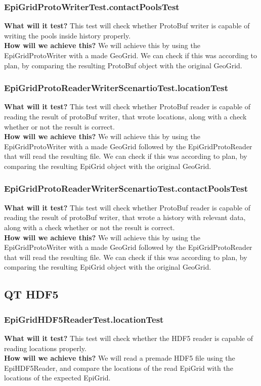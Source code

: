 \documentclass{article}
\begin{document}
\subsubsection{EpiGridProtoWriterTest.contactPoolsTest} 
\textbf{What will it test?} 
This test will check whether ProtoBuf writer is capable of writing the pools inside history properly. \\
\newline
\textbf{How will we achieve this?} 
We will achieve this by using the EpiGridProtoWriter with a made GeoGrid. We can check if this was according to plan, by comparing the resulting ProtoBuf object with the original GeoGrid.
\subsubsection{EpiGridProtoReaderWriterScenartioTest.locationTest} 
\textbf{What will it test?} 
This test will check whether ProtoBuf reader is capable of reading the result of protoBuf writer, that wrote locations, along with a check whether or not the result is correct. \\
\newline
\textbf{How will we achieve this?} 
We will achieve this by using the EpiGridProtoWriter with a made GeoGrid followed by the EpiGridProtoReader that will read the resulting file. We can check if this was according to plan, by comparing the resulting EpiGrid object with the original GeoGrid.
\subsubsection{EpiGridProtoReaderWriterScenartioTest.contactPoolsTest} 
\textbf{What will it test?} 
This test will check whether ProtoBuf reader is capable of reading the result of protoBuf writer, that wrote a history with relevant data, along with a check whether or not the result is correct. \\
\newline
\textbf{How will we achieve this?} 
We will achieve this by using the EpiGridProtoWriter with a made GeoGrid followed by the EpiGridProtoReader that will read the resulting file. We can check if this was according to plan, by comparing the resulting EpiGrid object with the original GeoGrid.
\subsection{QT HDF5}
\subsubsection{EpiGridHDF5ReaderTest.locationTest} 
\textbf{What will it test?} 
This test will check whether the HDF5 reader is capable of reading locations properly. \\
\newline
\textbf{How will we achieve this?} 
We will read a premade HDF5 file using the EpiHDF5Reader, and compare the locations of the read EpiGrid with the locations of the expected EpiGrid.
\end{document}
